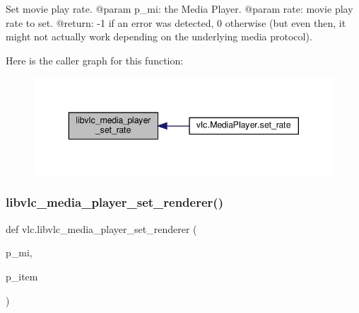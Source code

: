 \begin{DoxyVerb}Set movie play rate.
@param p_mi: the Media Player.
@param rate: movie play rate to set.
@return: -1 if an error was detected, 0 otherwise (but even then, it might not actually work depending on the underlying media protocol).
\end{DoxyVerb}
 Here is the caller graph for this function\+:
\nopagebreak
\begin{figure}[H]
\begin{center}
\leavevmode
\includegraphics[width=343pt]{namespacevlc_a2b9fb9b6a7652775b6ae4b4cb0782854_icgraph}
\end{center}
\end{figure}
\mbox{\label{namespacevlc_af049b733fbfa570005d2cb436dc7edf1}} 
\subsubsection{\texorpdfstring{libvlc\+\_\+media\+\_\+player\+\_\+set\+\_\+renderer()}{libvlc\_media\_player\_set\_renderer()}}
{\footnotesize\ttfamily def vlc.\+libvlc\+\_\+media\+\_\+player\+\_\+set\+\_\+renderer (\begin{DoxyParamCaption}\item[{}]{p\+\_\+mi,  }\item[{}]{p\+\_\+item }\end{DoxyParamCaption})}

